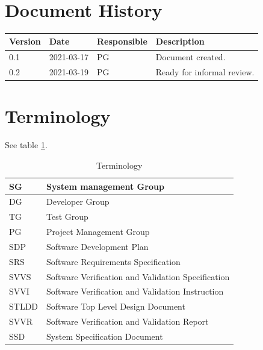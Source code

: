 \documentclass{article}
\date {#1}
\title {
    \documentNumber {08}
    \documentVersion {0.2}
    \documentTitle {Project Final Report}
    \documentGroup {2}
    \documentResponsible {Project Management Group}
    \documentAuthors {Project Management group}
    \documentDate {2021-03-18}
}
\begin{document}
\maketitle
\thispagestyle{empty}

\newpage

\tableofcontents

\newpage

\section{Document History}
\begin{tabular}{ l | l | l | l }
    Version & Date & Responsible & Description \\
    \hline
    0.1 & 2021-03-17 & PG & Document created. \\
    \hline
    0.2 & 2021-03-19 & PG & Ready for informal review. \\
\end{tabular}

\section{Terminology}
    
    See table \ref{Terminology}.
    
    \begin{table}[h]
        \centering
        \begin{tabular}{| l | l |}
            \hline
                SG & System management Group \\
            \hline
                DG & Developer Group \\
            \hline
                TG & Test Group \\
            \hline
                PG & Project Management Group \\
            \hline 
                SDP & Software Development Plan \\
            \hline
                SRS & Software Requirements Specification \\
            \hline
                SVVS & Software Verification and Validation Specification \\
            \hline
                SVVI & Software Verification and Validation Instruction \\
            \hline
                STLDD & Software Top Level Design Document \\
            \hline
                SVVR & Software Verification and Validation Report \\
            \hline
                SSD & System Specification Document \\
            \hline
        \end{tabular}
        \caption{Terminology}
        \label{Terminology}
    \end{table}
\end{document}
